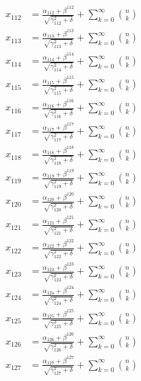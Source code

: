 \documentclass{article}
\begin{document}
\begin{align}
  x_{112} &= \frac{\alpha_{112} + \beta^{112}}{\sqrt{\gamma_{112}^2 + \delta}} + \sum_{k=0}^{\infty} \binom{n}{k} \label{eq:112} \\
  x_{113} &= \frac{\alpha_{113} + \beta^{113}}{\sqrt{\gamma_{113}^2 + \delta}} + \sum_{k=0}^{\infty} \binom{n}{k} \label{eq:113} \\
  x_{114} &= \frac{\alpha_{114} + \beta^{114}}{\sqrt{\gamma_{114}^2 + \delta}} + \sum_{k=0}^{\infty} \binom{n}{k} \label{eq:114} \\
  x_{115} &= \frac{\alpha_{115} + \beta^{115}}{\sqrt{\gamma_{115}^2 + \delta}} + \sum_{k=0}^{\infty} \binom{n}{k} \label{eq:115} \\
  x_{116} &= \frac{\alpha_{116} + \beta^{116}}{\sqrt{\gamma_{116}^2 + \delta}} + \sum_{k=0}^{\infty} \binom{n}{k} \label{eq:116} \\
  x_{117} &= \frac{\alpha_{117} + \beta^{117}}{\sqrt{\gamma_{117}^2 + \delta}} + \sum_{k=0}^{\infty} \binom{n}{k} \label{eq:117} \\
  x_{118} &= \frac{\alpha_{118} + \beta^{118}}{\sqrt{\gamma_{118}^2 + \delta}} + \sum_{k=0}^{\infty} \binom{n}{k} \label{eq:118} \\
  x_{119} &= \frac{\alpha_{119} + \beta^{119}}{\sqrt{\gamma_{119}^2 + \delta}} + \sum_{k=0}^{\infty} \binom{n}{k} \label{eq:119} \\
  x_{120} &= \frac{\alpha_{120} + \beta^{120}}{\sqrt{\gamma_{120}^2 + \delta}} + \sum_{k=0}^{\infty} \binom{n}{k} \label{eq:120} \\
  x_{121} &= \frac{\alpha_{121} + \beta^{121}}{\sqrt{\gamma_{121}^2 + \delta}} + \sum_{k=0}^{\infty} \binom{n}{k} \label{eq:121} \\
  x_{122} &= \frac{\alpha_{122} + \beta^{122}}{\sqrt{\gamma_{122}^2 + \delta}} + \sum_{k=0}^{\infty} \binom{n}{k} \label{eq:122} \\
  x_{123} &= \frac{\alpha_{123} + \beta^{123}}{\sqrt{\gamma_{123}^2 + \delta}} + \sum_{k=0}^{\infty} \binom{n}{k} \label{eq:123} \\
  x_{124} &= \frac{\alpha_{124} + \beta^{124}}{\sqrt{\gamma_{124}^2 + \delta}} + \sum_{k=0}^{\infty} \binom{n}{k} \label{eq:124} \\
  x_{125} &= \frac{\alpha_{125} + \beta^{125}}{\sqrt{\gamma_{125}^2 + \delta}} + \sum_{k=0}^{\infty} \binom{n}{k} \label{eq:125} \\
  x_{126} &= \frac{\alpha_{126} + \beta^{126}}{\sqrt{\gamma_{126}^2 + \delta}} + \sum_{k=0}^{\infty} \binom{n}{k} \label{eq:126} \\
  x_{127} &= \frac{\alpha_{127} + \beta^{127}}{\sqrt{\gamma_{127}^2 + \delta}} + \sum_{k=0}^{\infty} \binom{n}{k} \label{eq:127} \\

\end{align}
\end{document}
